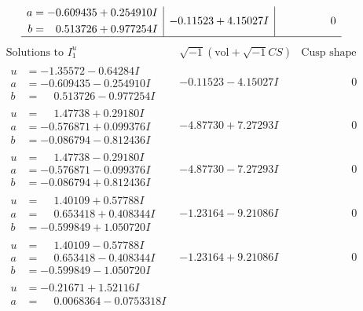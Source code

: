 \documentclass[1p]{elsarticle_modified}
\theoremstyle{definition}
\newcommand{\I}{\sqrt{-1}}
\begin{document}
$$\begin{array}{c|c|c}
\begin{aligned}
a &= -0.609435 + 0.254910 I \\
b &= \phantom{-}0.513726 + 0.977254 I\end{aligned}
 & -0.11523 + 4.15027 I & \phantom{-0.000000 } 0\\
 \hline 
 \end{array}$$\newpage$$\begin{array}{c|c|c}  
\text{Solutions to }I^u_{1}& \I (\text{vol} + \sqrt{-1}CS) & \text{Cusp shape}\\
 \hline 
\begin{aligned}
u &= -1.35572 - 0.64284 I \\
a &= -0.609435 - 0.254910 I \\
b &= \phantom{-}0.513726 - 0.977254 I\end{aligned}
 & -0.11523 - 4.15027 I & \phantom{-0.000000 } 0 \\ \hline\begin{aligned}
u &= \phantom{-}1.47738 + 0.29180 I \\
a &= -0.576871 + 0.099376 I \\
b &= -0.086794 - 0.812436 I\end{aligned}
 & -4.87730 + 7.27293 I & \phantom{-0.000000 } 0 \\ \hline\begin{aligned}
u &= \phantom{-}1.47738 - 0.29180 I \\
a &= -0.576871 - 0.099376 I \\
b &= -0.086794 + 0.812436 I\end{aligned}
 & -4.87730 - 7.27293 I & \phantom{-0.000000 } 0 \\ \hline\begin{aligned}
u &= \phantom{-}1.40109 + 0.57788 I \\
a &= \phantom{-}0.653418 + 0.408344 I \\
b &= -0.599849 + 1.050720 I\end{aligned}
 & -1.23164 - 9.21086 I & \phantom{-0.000000 } 0 \\ \hline\begin{aligned}
u &= \phantom{-}1.40109 - 0.57788 I \\
a &= \phantom{-}0.653418 - 0.408344 I \\
b &= -0.599849 - 1.050720 I\end{aligned}
 & -1.23164 + 9.21086 I & \phantom{-0.000000 } 0 \\ \hline\begin{aligned}
u &= -0.21671 + 1.52116 I \\
a &= \phantom{-}0.0068364 - 0.0753318 I \\

\end{aligned}
\end{array}$$
\end{document}

